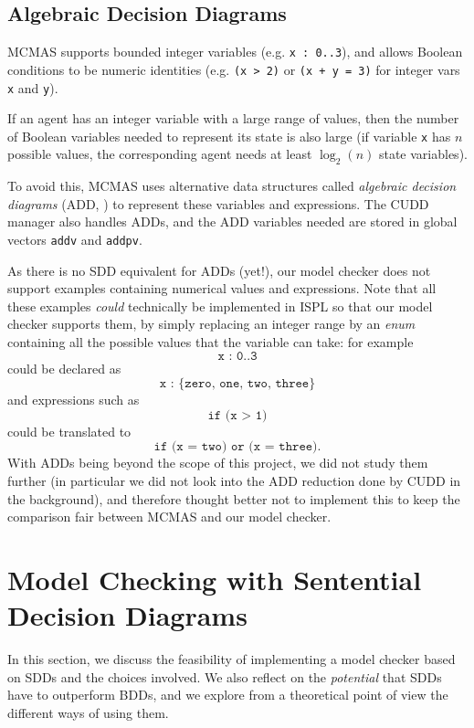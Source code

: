 \documentclass[11pt]{report}
\begin{document}
\subsection{Algebraic Decision Diagrams}
\label{algebraic_decision_diagrams}

MCMAS supports bounded integer variables (e.g. \texttt{x : 0..3}), and allows Boolean conditions to be numeric identities (e.g. \texttt{(x > 2)} or \texttt{(x + y = 3)} for integer vars \texttt{x} and \texttt{y}). 

If an agent has an integer variable with a large range of values, then the number of Boolean variables needed to represent its state is also large (if variable \texttt{x} has $n$ possible values, the corresponding agent needs at least $\log_2(n)$ state variables). 

To avoid this, MCMAS uses alternative data structures called \textit{algebraic decision diagrams} (ADD, \cite{add}) to represent these variables and expressions. The CUDD manager also handles ADDs, and the ADD variables needed are stored in global vectors \texttt{addv} and \texttt{addpv}.

As there is no SDD equivalent for ADDs (yet!), our model checker does not support examples containing numerical values and expressions.
Note that all these examples \textit{could} technically be implemented in ISPL so that our model checker supports them, by simply replacing an integer range by an \textit{enum} containing all the possible values that the variable can take: for example 
$$\texttt{x : 0..3} $$
could be declared as $$\texttt{x : \{zero, one, two, three\}}$$
and expressions such as $$\texttt{if (x > 1)}$$ could be translated to $$\texttt{if (x = two) or (x = three)}.$$
With ADDs being beyond the scope of this project, we did not study them further (in particular we did not look into the ADD reduction done by CUDD in the background), and therefore thought better not to implement this to keep the comparison fair between MCMAS and our model checker. 

\section{Model Checking with Sentential Decision Diagrams}
\label{3.3}
In this section, we discuss the feasibility of implementing a model checker based on SDDs and the choices involved. We also reflect on the \textit{potential }that SDDs have to outperform BDDs, and we explore from a theoretical point of view the different ways of using them.
\end{document}
